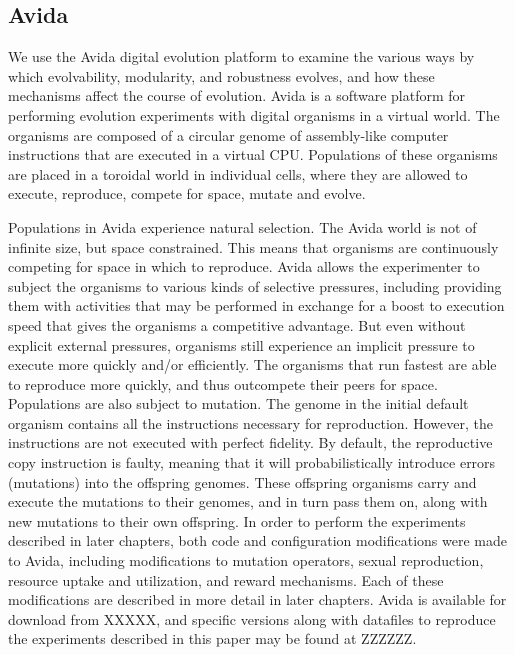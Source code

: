 \subsection{Avida}

We use the Avida digital evolution platform to examine the various ways by which evolvability, modularity, and robustness evolves, and how these mechanisms affect the course of evolution.
Avida is a software platform for performing evolution experiments with digital organisms in a virtual world. The organisms are composed of a circular genome of assembly-like computer instructions that are executed in a virtual CPU. Populations of these organisms are placed in a toroidal world in individual cells, where they are allowed to execute, reproduce, compete for space, mutate and evolve. 
 
Populations in Avida experience natural selection. The Avida world is not of infinite size, but space constrained. This means that organisms are continuously competing for space in which to reproduce.  Avida allows the experimenter to subject the organisms to various kinds of selective pressures, including providing them with activities that may be performed in exchange for a boost to execution speed that gives the organisms a competitive advantage. But even without explicit external pressures, organisms still experience an implicit pressure to execute more quickly and/or efficiently. The organisms that run fastest are able to reproduce more quickly, and thus outcompete their peers for space.  
Populations are also subject to mutation. The genome in the initial default organism contains all the instructions necessary for reproduction. However, the instructions are not executed with perfect fidelity. By default, the reproductive copy instruction is faulty, meaning that it will probabilistically introduce errors (mutations) into the offspring genomes. These offspring organisms carry and execute the mutations to their genomes, and in turn pass them on, along with new mutations to their own offspring.
In order to perform the experiments described in later chapters, both code and configuration modifications were made to Avida, including modifications to mutation operators, sexual reproduction, resource uptake and utilization, and reward mechanisms. Each of these modifications are described in more detail in later chapters.
Avida is available for download from XXXXX, and specific versions along with datafiles to reproduce the experiments described in this paper may be found at ZZZZZZ.